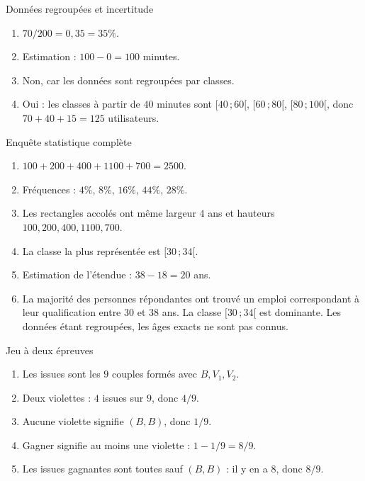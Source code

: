 \documentclass[11pt,a4paper]{article}
\newcommand{\classe}[2]{\ensuremath{[#1\,;#2[}}
\newcounter{corr}
\begin{document}
\begin{corrbox}{Données regroupées et incertitude}
\begin{enumerate}
\item $70/200=0{,}35=35\%$.
\item Estimation : $100-0=100$ minutes.
\item Non, car les données sont regroupées par classes.
\item Oui : les classes à partir de $40$ minutes sont \classe{40}{60}, \classe{60}{80}, \classe{80}{100}, donc $70+40+15=125$ utilisateurs.
\end{enumerate}
\end{corrbox}

\begin{corrbox}{Enquête statistique complète}
\begin{enumerate}
\item $100+200+400+1100+700=2500$.
\item Fréquences : $4\%$, $8\%$, $16\%$, $44\%$, $28\%$.
\item Les rectangles accolés ont même largeur $4$ ans et hauteurs $100,200,400,1100,700$.
\item La classe la plus représentée est \classe{30}{34}.
\item Estimation de l'étendue : $38-18=20$ ans.
\item La majorité des personnes répondantes ont trouvé un emploi correspondant à leur qualification entre $30$ et $38$ ans. La classe \classe{30}{34} est dominante. Les données étant regroupées, les âges exacts ne sont pas connus.
\end{enumerate}
\end{corrbox}

\begin{corrbox}{Jeu à deux épreuves}
\begin{enumerate}
\item Les issues sont les $9$ couples formés avec $B,V_1,V_2$.
\item Deux violettes : $4$ issues sur $9$, donc $4/9$.
\item Aucune violette signifie $(B,B)$, donc $1/9$.
\item Gagner signifie au moins une violette : $1-1/9=8/9$.
\item Les issues gagnantes sont toutes sauf $(B,B)$ : il y en a $8$, donc $8/9$.
\end{enumerate}
\end{corrbox}
\end{document}

